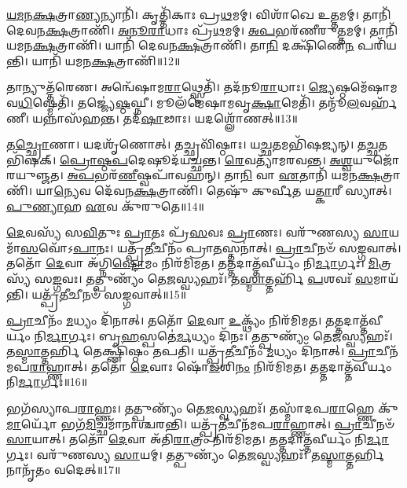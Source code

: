 \-\ul{𑌯}\-\-\ul{𑌮}\-\-\ul{𑌨}\-\-\ul{𑌕𑍍𑌷}\-𑌤𑍍𑌰𑌾\-\ul{𑌣𑍍𑌯}\-𑌨𑍍𑌯𑌾𑌨𑌿᳴।
𑌕𑍃𑌤𑍍𑌤𑌿᳴𑌕𑌾𑌃 𑌪𑍍𑌰\-\ul{𑌥}\-𑌮𑌮𑍍।
𑌵𑌿𑌶𑌾᳴𑌖𑍇 𑌉\-\ul{𑌤𑍍𑌤}\-𑌮𑌮𑍍।
𑌤𑌾𑌨𑌿᳴ 𑌦𑍇𑌵𑌨\-\ul{𑌕𑍍𑌷}\-𑌤𑍍𑌰𑌾𑌣𑌿᳴।
\-\ul{𑌅}\-\-\ul{𑌨𑍂}\-\-\ul{𑌰𑌾}\-𑌧𑌾𑌃 𑌪𑍍𑌰᳴\-\ul{𑌥}\-𑌮𑌮𑍍।
\-\ul{𑌅}\-\-\ul{𑌪}\-𑌭𑌰᳴𑌣𑍀𑌰𑍁\-\ul{𑌤𑍍𑌤}\-𑌮𑌮𑍍।
𑌤𑌾𑌨𑌿᳴ 𑌯𑌮𑌨\-\ul{𑌕𑍍𑌷}\-𑌤𑍍𑌰𑌾𑌣𑌿᳴।
𑌯𑌾𑌨𑌿᳴ 𑌦𑍇𑌵𑌨\-\ul{𑌕𑍍𑌷}\-𑌤𑍍𑌰𑌾𑌣𑌿᳴।
𑌤𑌾\-\ul{𑌨𑌿} 𑌦𑌕𑍍𑌷𑌿᳴𑌣𑍇\-\ul{𑌨} 𑌪𑌰𑌿᳴𑌯𑌨𑍍𑌤𑌿।
𑌯𑌾𑌨𑌿᳴ 𑌯𑌮𑌨\-\ul{𑌕𑍍𑌷}\-𑌤𑍍𑌰𑌾𑌣𑌿᳴॥12॥

𑌤𑌾𑌨𑍍𑌯𑍁𑌤𑍍𑌤᳴𑌰𑍇𑌣।
𑌅𑌨𑍍𑌵𑍇᳴𑌷𑌾𑌮\-\ul{𑌰𑌾}\-𑌥𑍍𑌸𑍍𑌮𑍇𑌤𑌿᳴।
𑌤𑌦᳴𑌨𑍂\-\ul{𑌰𑌾}\-𑌧𑌾𑌃।
\-\ul{𑌜𑍍𑌯𑍇}\-𑌷𑍍𑌠𑌮𑍇᳴𑌷𑌾𑌮\-𑌵\-\ul{𑌧𑌿}\-𑌷𑍍𑌮𑍇𑌤𑌿᳴।
𑌤𑌜𑍍𑌜𑍍𑌯𑍇॑\-\ul{𑌷𑍍𑌠}\-𑌘𑍍𑌨𑍀।
𑌮𑍂𑌲᳴𑌮𑍇𑌷𑌾𑌮𑌵𑍃\-\ul{𑌕𑍍𑌷𑌾}\-𑌮𑍇𑌤𑌿᳴।
𑌤𑌨𑍍𑌮𑍂᳴\-\ul{𑌲}\-𑌵𑌰𑍍\mbox{}𑌹᳴𑌣𑍀।
𑌯𑌨𑍍𑌨𑌾𑌸᳴𑌹𑌨𑍍𑌤।
𑌤𑌦᳴\-\ul{𑌷𑌾}\-𑌢𑌾𑌃।
𑌯𑌦𑌶𑍍𑌲𑍋᳴𑌣𑌤𑍍॥13॥

𑌤\-\ul{𑌚𑍍𑌛𑍍𑌰𑍋}\-𑌣𑌾।
𑌯𑌦𑌶𑍃᳴𑌣𑍋𑌤𑍍।
𑌤𑌚𑍍𑌛𑍍𑌰𑌵𑌿᳴𑌷𑍍𑌠𑌾𑌃।
𑌯\-\ul{𑌚𑍍𑌛}\-𑌤𑌮𑌭𑌿᳴𑌷𑌜𑍍𑌯𑌨𑍍।
𑌤\-\ul{𑌚𑍍𑌛}\-𑌤𑌭𑌿᳴𑌷𑌕𑍍।
\-\ul{𑌪𑍍𑌰𑍋}\-\-\ul{𑌷𑍍𑌠}\-\-\ul{𑌪}\-𑌦𑍇𑌷𑍂𑌦᳴𑌯𑌚𑍍𑌛𑌨𑍍𑌤।
\-\ul{𑌰𑍇}\-𑌵𑌤𑍍𑌯𑌾᳴𑌮𑌰𑌵𑌨𑍍𑌤।
\-\ul{𑌅}\-\-\ul{𑌶𑍍𑌵}\-𑌯𑍁𑌜𑍋᳴𑌰\-𑌯𑍁𑌞𑍍𑌜𑌤।
\-\ul{𑌅}\-\-\ul{𑌪}\-𑌭𑌰᳴\-\ul{𑌣𑍀}\-𑌷𑍍𑌵𑌪𑌾᳴𑌵𑌹𑌨𑍍।
𑌤𑌾\-\ul{𑌨𑌿} 𑌵𑌾 \ul{𑌏}\-𑌤𑌾𑌨𑌿᳴ 𑌯𑌮𑌨\-\ul{𑌕𑍍𑌷}\-𑌤𑍍𑌰𑌾𑌣𑌿᳴।
𑌯𑌾\-\ul{𑌨𑍍𑌯𑍇}\-𑌵 𑌦𑍇᳴𑌵𑌨\-\ul{𑌕𑍍𑌷}\-𑌤𑍍𑌰𑌾𑌣𑌿᳴।
𑌤𑍇𑌷𑍁᳴ 𑌕𑍁𑌰𑍍𑌵𑍀𑌤 𑌯\-\ul{𑌤𑍍𑌕𑌾}\-𑌰𑍀 𑌸𑍍𑌯𑌾𑌤𑍍।
\-\ul{𑌪𑍁}\-\-\ul{𑌣𑍍𑌯𑌾}\-𑌹 \ul{𑌏}\-𑌵 𑌕𑍁᳴𑌰𑍁𑌤𑍇॥14॥

\-\ul{𑌦𑍇}\-𑌵𑌸𑍍𑌯᳴ 𑌸\-\ul{𑌵𑌿}\-𑌤𑍁𑌃 \ul{𑌪𑍍𑌰𑌾}\-𑌤𑌃 𑌪𑍍𑌰᳴\-\ul{𑌸}\-𑌵𑌃 \ul{𑌪𑍍𑌰𑌾}\-𑌣𑌃।
𑌵𑌰𑍁᳴𑌣𑌸𑍍𑌯 \ul{𑌸𑌾}\-𑌯𑌮𑌾᳴\-\ul{𑌸}\-𑌵𑍋᳴\-𑌽\-\ul{𑌪𑌾}\-𑌨𑌃।
𑌯𑌤𑍍𑌪𑍍𑌰᳴\-\ul{𑌤𑍀}\-𑌚𑍀𑌨𑌂᳴ 𑌪𑍍𑌰𑌾\-\ul{𑌤}\-𑌸𑍍𑌤𑌨𑌾॑𑌤𑍍।
\-\ul{𑌪𑍍𑌰𑌾}\-𑌚𑍀𑌨𑍞᳴ 𑌸\-\ul{𑌙𑍍𑌗}\-𑌵𑌾𑌤𑍍।
𑌤𑌤𑍋᳴ \ul{𑌦𑍇}\-𑌵𑌾 𑌅᳴𑌗𑍍𑌨𑌿\-\ul{𑌷𑍍𑌟𑍋}\-𑌮𑌂 𑌨𑌿𑌰᳴𑌮𑌿𑌮𑌤।
𑌤𑌤𑍍𑌤𑌦𑌾𑌤𑍍𑌤᳴𑌵𑍀𑌰𑍍𑌯𑌂 𑌨𑌿\-\ul{𑌰𑍍𑌮𑌾}\-𑌰𑍍𑌗𑌃।
\-\ul{𑌮𑌿}\-𑌤𑍍𑌰𑌸𑍍𑌯᳴ 𑌸\-\ul{𑌙𑍍𑌗}\-𑌵𑌃।
𑌤𑌤𑍍𑌪𑍁𑌣𑍍𑌯𑌂᳴ 𑌤𑍇\-\ul{𑌜}\-𑌸𑍍𑌵𑍍𑌯𑌹𑌃᳴।
𑌤\-\ul{𑌸𑍍𑌮𑌾}\-𑌤𑍍𑌤𑌰𑍍\mbox{}𑌹𑌿᳴ \ul{𑌪}\-𑌶𑌵𑌃᳴ \ul{𑌸}\-𑌮𑌾𑌯᳴𑌨𑍍𑌤𑌿।
𑌯𑌤𑍍𑌪𑍍𑌰᳴\-\ul{𑌤𑍀}\-𑌚𑍀𑌨𑍞᳴ 𑌸\-\ul{𑌙𑍍𑌗}\-𑌵𑌾𑌤𑍍॥15॥

\-\ul{𑌪𑍍𑌰𑌾}\-𑌚𑍀𑌨𑌂᳴ \ul{𑌮}\-𑌧𑍍𑌯𑌂 𑌦𑌿᳴𑌨𑌾𑌤𑍍।
𑌤𑌤𑍋᳴ \ul{𑌦𑍇}\-𑌵𑌾 \ul{𑌉}\-𑌕𑍍𑌥𑍍𑌯𑌂᳴ 𑌨𑌿𑌰᳴𑌮𑌿𑌮𑌤।
𑌤𑌤𑍍𑌤𑌦𑌾𑌤𑍍𑌤᳴𑌵𑍀𑌰𑍍𑌯𑌂 𑌨𑌿\-\ul{𑌰𑍍𑌮𑌾}\-𑌰𑍍𑌗𑌃।
𑌬𑍃\-\ul{𑌹}\-𑌸𑍍𑌪𑌤𑍇॑\-\ul{𑌰𑍍𑌮}\-𑌧𑍍𑌯𑌂 𑌦𑌿᳴𑌨𑌃।
𑌤𑌤𑍍𑌪𑍁𑌣𑍍𑌯𑌂᳴ 𑌤𑍇\-\ul{𑌜}\-𑌸𑍍𑌵𑍍𑌯𑌹𑌃᳴।
𑌤\-\ul{𑌸𑍍𑌮𑌾}\-𑌤𑍍𑌤𑌰𑍍\mbox{}\-\ul{𑌹𑌿} 𑌤𑍇𑌕𑍍𑌷𑍍𑌣𑌿᳴𑌷𑍍𑌠𑌂 𑌤𑌪𑌤𑌿।
𑌯𑌤𑍍𑌪𑍍𑌰᳴\-\ul{𑌤𑍀}\-𑌚𑍀𑌨𑌂᳴ \ul{𑌮}\-𑌧𑍍𑌯𑌂 𑌦𑌿᳴𑌨𑌾𑌤𑍍।
\-\ul{𑌪𑍍𑌰𑌾}\-𑌚𑍀𑌨᳴𑌮𑌪\-\ul{𑌰𑌾}\-𑌹𑍍𑌣𑌾𑌤𑍍।
𑌤𑌤𑍋᳴ \ul{𑌦𑍇}\-𑌵𑌾𑌃 𑌷𑍋᳴\-\ul{𑌡}\-𑌶𑌿\-\ul{𑌨𑌂} 𑌨𑌿𑌰᳴𑌮𑌿𑌮𑌤।
𑌤𑌤𑍍𑌤𑌦𑌾𑌤𑍍𑌤᳴𑌵𑍀𑌰𑍍𑌯𑌂 𑌨𑌿\-\ul{𑌰𑍍𑌮𑌾}\-𑌰𑍍𑌗𑌃॥16॥

𑌭𑌗᳴𑌸𑍍𑌯𑌾𑌪\-\ul{𑌰𑌾}\-𑌹𑍍𑌣𑌃।
𑌤𑌤𑍍𑌪𑍁𑌣𑍍𑌯𑌂᳴ 𑌤𑍇\-\ul{𑌜}\-𑌸𑍍𑌵𑍍𑌯𑌹𑌃᳴।
𑌤𑌸𑍍𑌮𑌾᳴𑌦𑌪\-\ul{𑌰𑌾}\-𑌹𑍍𑌣𑍇 𑌕𑍁᳴\-\ul{𑌮𑌾}\-𑌰𑍍𑌯𑍋᳴ 𑌭𑌗᳴\-\ul{𑌮𑌿}\-𑌚𑍍𑌛𑌮𑌾᳴𑌨𑌾𑌶𑍍𑌚𑌰𑌨𑍍𑌤𑌿।
𑌯𑌤𑍍𑌪𑍍𑌰᳴\-\ul{𑌤𑍀}\-𑌚𑍀𑌨᳴𑌮𑌪\-\ul{𑌰𑌾}\-𑌹𑍍𑌣𑌾𑌤𑍍।
\-\ul{𑌪𑍍𑌰𑌾}\-𑌚𑍀𑌨𑍞᳴ \ul{𑌸𑌾}\-𑌯𑌾𑌤𑍍।
𑌤𑌤𑍋᳴ \ul{𑌦𑍇}\-𑌵𑌾 𑌅᳴𑌤𑌿\-\ul{𑌰𑌾}\-𑌤𑍍𑌰𑌂 𑌨𑌿𑌰᳴𑌮𑌿𑌮𑌤।
𑌤𑌤𑍍𑌤𑌦𑌾𑌤𑍍𑌤᳴𑌵𑍀𑌰𑍍𑌯𑌂 𑌨𑌿\-\ul{𑌰𑍍𑌮𑌾}\-𑌰𑍍𑌗𑌃।
𑌵𑌰𑍁᳴𑌣𑌸𑍍𑌯 \ul{𑌸𑌾}\-𑌯𑌮𑍍।
𑌤𑌤𑍍𑌪𑍁𑌣𑍍𑌯𑌂᳴ 𑌤𑍇\-\ul{𑌜}\-𑌸𑍍𑌵𑍍𑌯𑌹𑌃᳴।
𑌤\-\ul{𑌸𑍍𑌮𑌾}\-𑌤𑍍𑌤𑌰𑍍\mbox{}\-\ul{𑌹𑌿} 𑌨𑌾𑌨𑍃᳴𑌤𑌂 𑌵𑌦𑍇𑌤𑍍॥17॥


